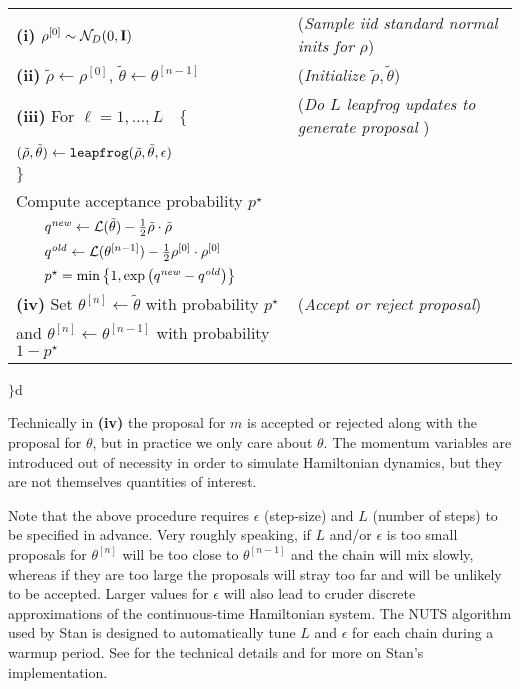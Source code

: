 \begin{tabular}{ll}
{\bf (i)} $\rho^{[0]} \sim \mathcal{N}_D(0, \mathbf{I})$ & ({\it Sample iid standard normal inits for $\rho$}) \\

{\bf (ii)} $\tilde{\rho} \leftarrow \rho^{[0]}$, $\tilde{\theta} \leftarrow \theta^{[n-1]}$ &  ({\it Initialize $\tilde{\rho}, \tilde{\theta}$})\\

{\bf (iii)} For $\ell = 1, \dots, L \quad \{$  & ({\it Do $L$ leapfrog updates to generate proposal }) \\[-8pt]

\qquad $(\tilde{\rho}, \tilde{\theta}) \leftarrow {\tt leapfrog}(\tilde{\rho}, \tilde{\theta}, \epsilon)$ & \\[-8pt]
\quad $\}$ & \\

\quad Compute acceptance probability $p^\star$  & \\[-8pt]
$\qquad  q^{\it new} \leftarrow  \mathcal{L}(\tilde{\theta}) - \tfrac{1}{2} \tilde{\rho} \cdot \tilde{\rho} $ & \\[-8pt]
$ \qquad q^{\it old} \leftarrow   \mathcal{L}(\theta^{[n-1]} ) -  \tfrac{1}{2} \rho^{[0]} \cdot \rho^{[0]} $ & \\[-8pt]
$ \qquad p^\star = \min{\left\{1, \exp{\left( q^{\it new} - q^{\it old} \right)} \right\}} $& \\[3pt]

{\bf (iv)} Set $\theta^{[n]} \leftarrow \tilde{\theta}$ with probability $p^\star$  & ({\it Accept or reject proposal})\\
\qquad and $\theta^{[n]} \leftarrow \theta^{[n-1]}$ with probability $ 1 - p^\star$ & \\

\end{tabular}

\noindent $\}$d

Technically in {\bf (iv)} the proposal for $m$ is accepted or rejected along with the proposal for 
$\theta$, but in practice we only care about $\theta$. The momentum variables are introduced out of necessity 
in order to simulate Hamiltonian dynamics, but they are not themselves quantities of interest.

Note that the above procedure requires $\epsilon$ (step-size) and $L$ (number of steps) to be specified in 
advance. Very roughly speaking, if $L$ and/or $\epsilon$ is too small proposals for $\theta^{[n]}$ will be too 
close to $\theta^{[n-1]}$ and the chain will mix slowly, whereas if they are too large the proposals will stray 
too far and will be unlikely to be accepted. Larger values for $\epsilon$ will also lead to cruder discrete
approximations of the continuous-time Hamiltonian system. The NUTS algorithm  
used by Stan is designed to automatically tune $L$ and $\epsilon$ for each chain during a warmup period. 
See  for the technical details and  for more 
on Stan's implementation. 





